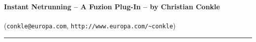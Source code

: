 \documentclass[11pt,twoside,a4paper]{article}
\title{\txtTITLE}
\date{ --- }
\begin{document}
\setlength\parindent{0pt} %


\begin{center}
	\textbf{\LARGE Instant Netrunning -- A Fuzion Plug-In -- by Christian Conkle } ~\\ ~\\
	(\texttt{conkle@europa.com}, \texttt{http://www.europa.com/\textasciitilde conkle})
\end{center}

\begin{center} \rule{0.85\textwidth}{0.01cm} \end{center}
\end{document}
